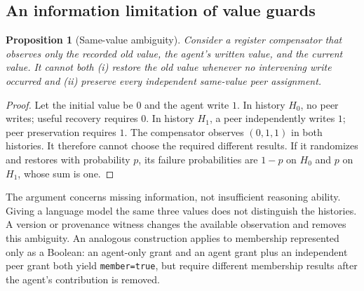 \documentclass[10pt,twocolumn]{article}
\newtheorem{proposition}[theorem]{Proposition}
\begin{document}
\subsection{An information limitation of value guards}
\begin{proposition}[Same-value ambiguity]
Consider a register compensator that observes only the recorded old value, the agent's written value, and the current value. It cannot both (i) restore the old value whenever no intervening write occurred and (ii) preserve every independent same-value peer assignment.
\end{proposition}
\begin{proof}
Let the initial value be $0$ and the agent write $1$. In history $H_0$, no peer writes; useful recovery requires $0$. In history $H_1$, a peer independently writes $1$; peer preservation requires $1$. The compensator observes $(0,1,1)$ in both histories. It therefore cannot choose the required different results. If it randomizes and restores with probability $p$, its failure probabilities are $1-p$ on $H_0$ and $p$ on $H_1$, whose sum is one.
\end{proof}

The argument concerns missing information, not insufficient reasoning ability. Giving a language model the same three values does not distinguish the histories. A version or provenance witness changes the available observation and removes this ambiguity. An analogous construction applies to membership represented only as a Boolean: an agent-only grant and an agent grant plus an independent peer grant both yield \texttt{member=true}, but require different membership results after the agent's contribution is removed.
\end{document}
